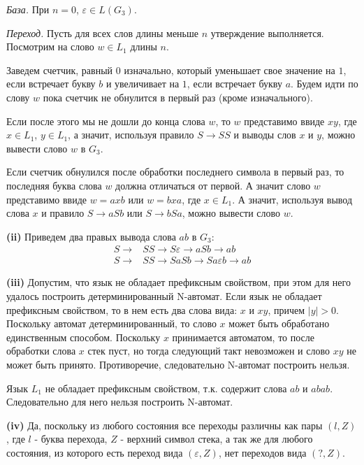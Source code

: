 \documentclass[10pt]{article}
\let \eps \varepsilon
\begin{document}
{\it База.} При $n = 0$, $\eps \in L(G_3)$.

{\it Переход.} Пусть для всех слов длины меньше $n$ утверждение выполняется. Посмотрим на слово $w \in L_1$ длины $n$.

Заведем счетчик, равный 0 изначально, который уменьшает свое значение на $1$, если встречает букву $b$ и увеличивает на $1$, если встречает букву $a$. Будем идти по слову $w$ пока счетчик не обнулится в первый раз (кроме изначального).

Если после этого мы не дошли до конца слова $w$, то $w$ представимо ввиде $xy$, где $x \in L_1$, $y \in L_1$, а значит, используя правило $S \rightarrow SS$ и выводы слов $x$ и $y$, можно вывести слово $w$ в $G_3$.

Если счетчик обнулился после обработки последнего символа в первый раз, то последняя буква слова $w$ должна отличаться от первой. А значит слово $w$ представимо ввиде $w = axb$ или $w = bxa$, где $x \in L_1$. А значит, используя вывод слова $x$ и правило $S \rightarrow aSb$ или $S \rightarrow bSa$, можно вывести слово $w$.

\smallskip

{\bf (ii)}
Приведем два правых вывода слова $ab$ в $G_3$:
\begin{align*}
  S \rightarrow& SS \rightarrow S \eps \rightarrow aSb \rightarrow ab \\
  S \rightarrow& SS \rightarrow SaSb \rightarrow Sa \eps b \rightarrow ab
\end{align*}

\smallskip

{\bf (iii)}
Допустим, что язык не обладает префиксным свойством, при этом для него удалось построить детерминированный N-автомат. Если язык не обладает префиксным свойством, то в нем есть два слова вида: $x$ и $xy$, причем $|y| > 0$. Поскольку автомат детерминированный, то слово $x$ может быть обработано единственным способом. Поскольку $x$ принимается автоматом, то после обработки слова $x$ стек пуст, но тогда следующий такт невозможен и слово $xy$ не может быть принято. Противоречие, следовательно N-автомат построить нельзя.

Язык $L_1$ не обладает префиксным свойством, т.к. содержит слова $ab$ и $abab$. Следовательно для него нельзя построить N-автомат.

\smallskip

{\bf (iv)}
Да, поскольку из любого состояния все переходы различны как пары $(l, Z)$, где $l$ - буква перехода, $Z$ - верхний символ стека, а так же для любого состояния, из которого есть переход вида $(\eps, Z)$, нет переходов вида $(?, Z)$.
\end{document}
